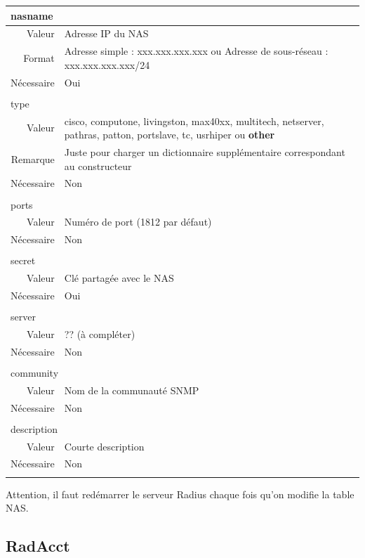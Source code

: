 \begin{tabular}{rl}
  \multicolumn{2}{l}{nasname} \\
  \hline
  Valeur & Adresse IP du NAS \\
	Format & Adresse simple : xxx.xxx.xxx.xxx ou Adresse de sous-réseau : xxx.xxx.xxx.xxx/24 \\
  Nécessaire & Oui \\
  \\
	\multicolumn{2}{l}{type} \\
  \hline
  Valeur & cisco, computone, livingston, max40xx, multitech, netserver, pathras, patton, portslave, tc, usrhiper ou \textbf{other} \\
	Remarque & Juste pour charger un dictionnaire supplémentaire correspondant au constructeur \\
	Nécessaire & Non \\
	\\
	\multicolumn{2}{l}{ports} \\
  \hline
  Valeur &  Numéro de port (1812 par défaut) \\
  Nécessaire & Non \\
	\\
	\multicolumn{2}{l}{secret} \\
  \hline
  Valeur &  Clé partagée avec le NAS \\
  Nécessaire & Oui \\
	\\
	\multicolumn{2}{l}{server} \\
  \hline
  Valeur &  ?? (à compléter) \\
  Nécessaire & Non \\
	\\
	\multicolumn{2}{l}{community} \\
  \hline
  Valeur & Nom de la communauté SNMP \\
  Nécessaire & Non \\
	\\
	\multicolumn{2}{l}{description} \\
  \hline
  Valeur &  Courte description \\
  Nécessaire & Non \\
	\\
\end{tabular}

Attention, il faut redémarrer le serveur Radius chaque fois qu'on modifie la table NAS.

\subsection{RadAcct}

